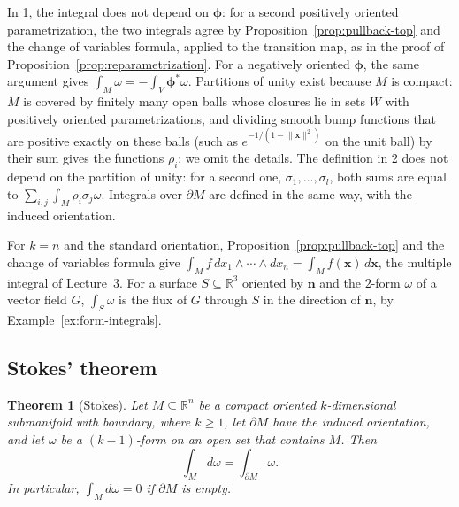 \documentclass[11pt]{article}
\newcommand{\norm}[1]{\lVert #1 \rVert}
\theoremstyle{definition}
\theoremstyle{plain}
\newtheorem{theorem}[definition]{Theorem}
\theoremstyle{remark}
\begin{document}
In 1, the integral does not depend on $\boldsymbol{\phi}$: for a second positively oriented parametrization, the two integrals agree by Proposition~\ref{prop:pullback-top} and the change of variables formula, applied to the transition map, as in the proof of Proposition~\ref{prop:reparametrization}. For a negatively oriented $\boldsymbol{\phi}$, the same argument gives $\int_M \omega = -\int_V \boldsymbol{\phi}^*\omega$. Partitions of unity exist because $M$ is compact: $M$ is covered by finitely many open balls whose closures lie in sets $W$ with positively oriented parametrizations, and dividing smooth bump functions that are positive exactly on these balls (such as $e^{-1/(1 - \norm{\mathbf{x}}^2)}$ on the unit ball) by their sum gives the functions $\rho_i$; we omit the details. The definition in 2 does not depend on the partition of unity: for a second one, $\sigma_1, \ldots, \sigma_l$, both sums are equal to $\sum_{i, j} \int_M \rho_i\sigma_j\omega$. Integrals over $\partial M$ are defined in the same way, with the induced orientation.

For $k = n$ and the standard orientation, Proposition~\ref{prop:pullback-top} and the change of variables formula give $\int_M f\, dx_1 \wedge \cdots \wedge dx_n = \int_M f(\mathbf{x})\, d\mathbf{x}$, the multiple integral of Lecture~3. For a surface $S \subseteq \mathbb{R}^3$ oriented by $\mathbf{n}$ and the $2$-form $\omega$ of a vector field $G$, $\int_S \omega$ is the flux of $G$ through $S$ in the direction of $\mathbf{n}$, by Example~\ref{ex:form-integrals}.

\subsection{Stokes' theorem}

\begin{theorem}[Stokes]\label{thm:stokes}
    Let $M \subseteq \mathbb{R}^n$ be a compact oriented $k$-dimensional submanifold with boundary, where $k \geq 1$, let $\partial M$ have the induced orientation, and let $\omega$ be a $(k - 1)$-form on an open set that contains $M$. Then
    \[\int_M d\omega = \int_{\partial M} \omega.\]
    In particular, $\int_M d\omega = 0$ if $\partial M$ is empty.
\end{theorem}
\end{document}
